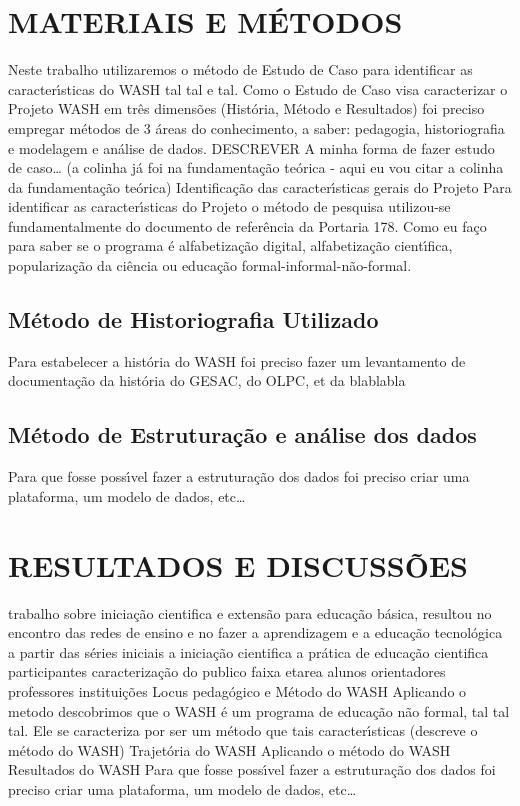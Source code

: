 \documentclass[
12pt,		%
openright,	%
twoside,  %
a4paper,			%
chapter=TITLE,		%
english,			%
french,				%
spanish,			%
brazil				%
]{USPSC-classe/USPSC}
\begin{document}
\chapter[MATERIAIS E M\'ETODOS]{MATERIAIS E M\'ETODOS}\label{MATERIAIS E M\'ETODOS}
Neste trabalho utilizaremos o m\'etodo de Estudo de Caso para identificar as caracter\'{\i}sticas do WASH tal tal e tal. Como o Estudo de Caso visa caracterizar o Projeto WASH em tr\^es dimens\~oes (Hist\'oria, M\'etodo e Resultados) foi preciso empregar m\'etodos de 3 \'areas do conhecimento, a saber: pedagogia, historiografia e modelagem e an\'alise de dados. 
DESCREVER A minha forma de fazer estudo de caso… (a colinha j\'a foi na fundamenta\c{c}\~ao te\'orica - aqui eu vou citar a colinha da fundamenta\c{c}\~ao te\'orica)
Identifica\c{c}\~ao das caracter\'{\i}sticas gerais do Projeto
Para identificar as caracter\'{\i}sticas do Projeto o m\'etodo de pesquisa utilizou-se fundamentalmente do documento de refer\^encia da Portaria 178.
Como eu fa\c{c}o para saber se o programa \'e alfabetiza\c{c}\~ao digital, alfabetiza\c{c}\~ao cient\'{\i}fica, populariza\c{c}\~ao da ci\^encia ou educa\c{c}\~ao formal-informal-n\~ao-formal.
\section[M\'etodo de Historiografia Utilizado ]{M\'etodo de Historiografia Utilizado }\label{M\'etodo de Historiografia Utilizado }
Para estabelecer a hist\'oria do WASH foi preciso fazer um levantamento de documenta\c{c}\~ao da hist\'oria do GESAC, do OLPC, et da blablabla
\section[M\'etodo de Estrutura\c{c}\~ao e an\'alise dos dados]{M\'etodo de Estrutura\c{c}\~ao e an\'alise dos dados}\label{M\'etodo de Estrutura\c{c}\~ao e an\'alise dos dados}
Para que fosse poss\'{\i}vel fazer a estrutura\c{c}\~ao dos dados foi preciso criar uma plataforma, um modelo de dados, etc…
\chapter[RESULTADOS E DISCUSS\~OES]{RESULTADOS E DISCUSS\~OES}\label{RESULTADOS E DISCUSS\~OES}
trabalho sobre inicia\c{c}\~ao  cientifica e extens\~ao para educa\c{c}\~ao b\'asica, resultou no encontro das redes de ensino  e no fazer a aprendizagem e  a educa\c{c}\~ao tecnol\'ogica   a partir das s\'eries iniciais
a inicia\c{c}\~ao cientifica
a pr\'atica de educa\c{c}\~ao cientifica
participantes
 caracteriza\c{c}\~ao do publico
faixa etarea
alunos
orientadores
professores
institui\c{c}\~oes
Locus pedag\'ogico e M\'etodo do WASH
 Aplicando o metodo descobrimos que o WASH \'e um programa de educa\c{c}\~ao n\~ao formal, tal tal tal.
Ele se caracteriza por ser um m\'etodo que tais caracter\'{\i}sticas (descreve o m\'etodo do WASH)
Trajet\'oria do WASH
Aplicando o m\'etodo do WASH
Resultados do WASH
Para que fosse poss\'{\i}vel fazer a estrutura\c{c}\~ao dos dados foi preciso criar uma plataforma, um modelo de dados, etc…
\end{document}
